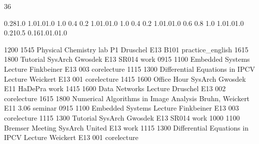 \documentclass[a4paper,10pt]{report}
\begin{document}
\thispagestyle{empty}
\begin{landscape}
\noindent{}

\setslotsize{2.8cm}{0.3cm}
 {36}
\settextframe{0.8mm}



 {0.28}{1.0} {1.0}{1.0}{1.0}
    {1.0} {0.4} {0.2} {1.0}{1.0}{1.0}
 {1.0} {0.4} {0.2} {1.0}{1.0}{1.0}
   {0.6} {0.8} {1.0} {1.0}{1.0}{1.0}
       {0.21}{0.5} {0.16}{1.0}{1.0}{1.0}

\begin{timetable}
   {1200} {1545} {Physical Chemistry lab P1}              {Druschel}        {E1{\tiny 3} B101}    {practice_english}
   {1615} {1800} {Tutorial SysArch}                       {Gwosdek}         {E1{\tiny 3} SR014}   {work}
   {0915} {1100} {Embedded Systems Lecture}               {Finkbeiner}      {E1{\tiny 3} 003}     {corelecture}
   {1115} {1300} {Differential Equations in IPCV Lecture} {Weickert}        {E1{\tiny 3} 001}     {corelecture}
   {1415} {1600} {Office Hour SysArch}                    {Gwosdek}         {E1{\tiny 1} HaDePra} {work}
   {1415} {1600} {Data Networks Lecture}                  {Druschel}        {E1{\tiny 3} 002}     {corelecture}
   {1615} {1800} {Numerical Algorithms in Image Analysis} {Bruhn, Weickert} {E1{\tiny 1} 3.06}    {seminar}
   {0915} {1100} {Embedded Systems Lecture}               {Finkbeiner}      {E1{\tiny 3} 003}     {corelecture}
   {1115} {1300} {Tutorial SysArch}                       {Gwosdek}         {E1{\tiny 3} SR014}   {work}
   {1000} {1100} {Bremser Meeting}                        {SysArch United}  {E1{\tiny 3}}         {work}
   {1115} {1300} {Differential Equations in IPCV Lecture} {Weickert}        {E1{\tiny 3} 001}     {corelecture}
\end{timetable}
\end{landscape}
\end{document}

